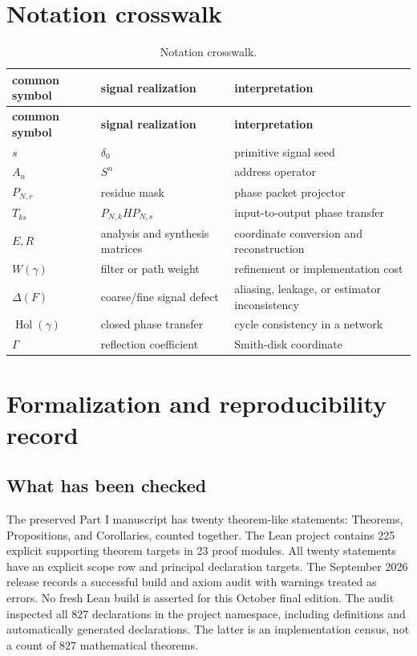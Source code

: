 \documentclass[11pt]{article}
\theoremstyle{definition}
\theoremstyle{remark}
\newcommand{\Gam}{\Gamma}
\begin{document}
\section{Notation crosswalk}

\begin{longtable}{L{0.20\textwidth}L{0.33\textwidth}L{0.37\textwidth}}
\caption{Notation crosswalk.}\label{tab:notation}\\
\toprule
\textbf{common symbol}&\textbf{signal realization}&\textbf{interpretation}\\
\midrule
\endfirsthead
\toprule
\textbf{common symbol}&\textbf{signal realization}&\textbf{interpretation}\\
\midrule
\endhead
$s$&$\delta_0$&primitive signal seed\\
$A_n$&$S^n$&address operator\\
$P_{N,r}$&residue mask&phase packet projector\\
$T_{ks}$&$P_{N,k}HP_{N,s}$&input-to-output phase transfer\\
$E,R$&analysis and synthesis matrices&coordinate conversion and reconstruction\\
$W(\gamma)$&filter or path weight&refinement or implementation cost\\
$\Delta(F)$&coarse/fine signal defect&aliasing, leakage, or estimator inconsistency\\
$\operatorname{Hol}(\gamma)$&closed phase transfer&cycle consistency in a network\\
$\Gam$&reflection coefficient&Smith-disk coordinate\\
\bottomrule
\end{longtable}

\clearpage
\section{Formalization and reproducibility record}\label{sec:formalization}

\subsection{What has been checked}

The preserved Part I manuscript has twenty theorem-like statements: Theorems, Propositions, and Corollaries, counted together. The Lean project contains 225 explicit supporting theorem targets in 23 proof modules. All twenty statements have an explicit scope row and principal declaration targets. The September 2026 release records a successful build and axiom audit with warnings treated as errors. No fresh Lean build is asserted for this October final edition. The audit inspected all 827 declarations in the project namespace, including definitions and automatically generated declarations. The latter is an implementation census, not a count of 827 mathematical theorems.
\end{document}

